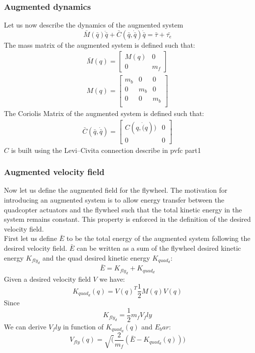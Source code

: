 \subsubsection{Augmented dynamics}
Let us now describe the dynamics of the augmented system
\begin{equation} 
    \bar{M}(\bar{q})\ddot{\bar{q}} + \bar{C}(\bar{q}, \dot{\bar{q}})\dot{\bar{q}} = \bar{\tau} + \bar{\tau_{e}}
\end{equation}
The mass matrix of the augmented system is defined such that:
\begin{align}
\bar{M}(q) = \begin{bmatrix} 
   M(q) & 0 \\
    0 & m_f
\end{bmatrix}\\
M(q) =  \begin{bmatrix} 
    m_b & 0 & 0 \\
    0 & m_b & 0 \\
    0 & 0 & m_b \\
 \end{bmatrix}
\end{align}
The Coriolis Matrix of the augmented system is defined such that: 
\begin{align}
\bar{C}(\bar{q}, \dot{\bar{q}}) = \begin{bmatrix} 
    C(q, \dot(q)) & 0 \\
    0 & 0 
\end{bmatrix}
\end{align}
$C$ is built using the Levi–Civita connection describe in pvfc part1
\subsubsection{Augmented velocity field}
Now let us define the augmented field for the flywheel. The motivation for introducing an augmented system is
to allow energy transfer between the quadcopter actuators and the flywheel such that the total kinetic energy in the system remains constant.
This property is enforced in the definition of the desired velocity field. \\
First let us define $\bar{E}$ to be the total energy of the augmented system following the desired velocity field.
$\bar{E}$ can be written as a sum of the flywheel desired kinetic energy $K_{fly_{d}}$ and the quad desired kinetic energy $K_{quad_{d}}$: 
\begin{equation}
    \bar{E} = K_{fly_{d}} + K_{quad_{d}}
\end{equation}
Given a desired velocity field $V$ we have: 
\begin{equation}
    K_{quad_{d}}(q) = V(q)^T\frac{1}{2}M(q)V(q)
\end{equation}
Since 
\begin{equation}
    K_{fly_{d}} = \frac{1}{2} m_f V_fly
\end{equation}
We can derive $V_fly$ in function of  $K_{quad_{d}}(q)$ and $E_bar$:
\begin{equation}
    V_{fly}(q) = \sqrt(\frac{2}{m_f}(\bar{E}- K_{quad_{d}}(q)))
\end{equation}

